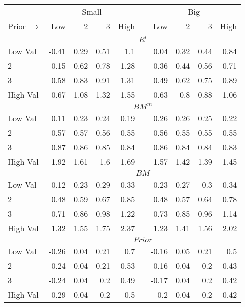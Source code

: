 
\begin{tabular}{lrrrrlrrrr}
  \toprule
    & \multicolumn{4}{c}{Small} & & \multicolumn{4}{c}{Big} \\
      \cmidrule(r){2-5} \cmidrule(r){7-10}
  Prior $\rightarrow$ & Low & 2 & 3 & High & & Low & 2 & 3 & High \\ 
  \midrule
  

    & \multicolumn{9}{c}{$R^i$} \\
    Low Val    & -0.41  & 0.29  & 0.51  & 1.1  & & 0.04  & 0.32  & 0.44  & 0.84  \\
           2   & 0.15  & 0.62  & 0.78  & 1.28  & & 0.36  & 0.44  & 0.56  & 0.71  \\
           3   & 0.58  & 0.83  & 0.91  & 1.31  & & 0.49  & 0.62  & 0.75  & 0.89  \\
    High Val   & 0.67  & 1.08  & 1.32  & 1.55  & & 0.63  & 0.8  & 0.88  & 1.06  \\
    [1em]
  

    & \multicolumn{9}{c}{$BM^m$} \\
    Low Val    & 0.11  & 0.23  & 0.24  & 0.19  & & 0.26  & 0.26  & 0.25  & 0.22  \\
           2   & 0.57  & 0.57  & 0.56  & 0.55  & & 0.56  & 0.55  & 0.55  & 0.55  \\
           3   & 0.87  & 0.86  & 0.85  & 0.84  & & 0.86  & 0.84  & 0.84  & 0.83  \\
    High Val   & 1.92  & 1.61  & 1.6  & 1.69  & & 1.57  & 1.42  & 1.39  & 1.45  \\
    [1em]
  

    & \multicolumn{9}{c}{$BM$} \\
    Low Val    & 0.12  & 0.23  & 0.29  & 0.33  & & 0.23  & 0.27  & 0.3  & 0.34  \\
           2   & 0.48  & 0.59  & 0.67  & 0.85  & & 0.48  & 0.57  & 0.64  & 0.78  \\
           3   & 0.71  & 0.86  & 0.98  & 1.22  & & 0.73  & 0.85  & 0.96  & 1.14  \\
    High Val   & 1.32  & 1.55  & 1.75  & 2.37  & & 1.23  & 1.41  & 1.56  & 2.02  \\
    [1em]
  

    & \multicolumn{9}{c}{$Prior$} \\
    Low Val    & -0.26  & 0.04  & 0.21  & 0.7  & & -0.16  & 0.05  & 0.21  & 0.5  \\
           2   & -0.24  & 0.04  & 0.21  & 0.53  & & -0.16  & 0.04  & 0.2  & 0.43  \\
           3   & -0.24  & 0.04  & 0.2  & 0.49  & & -0.17  & 0.04  & 0.2  & 0.42  \\
    High Val   & -0.29  & 0.04  & 0.2  & 0.5  & & -0.2  & 0.04  & 0.2  & 0.42  \\
    [1em]
  


\end{tabular}
